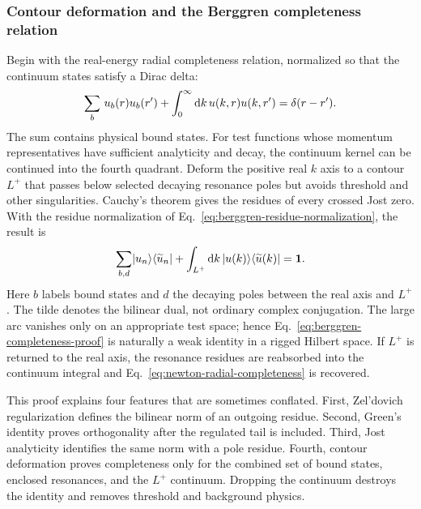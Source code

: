 \subsubsection*{Contour deformation and the Berggren completeness relation}

Begin with the real-energy radial completeness relation, normalized so that
the continuum states satisfy a Dirac delta:
\begin{equation}
  \sum_{b}\,u_b(r)u_b(r')
  +\int_0^\infty\mathrm{d} k\,u(k,r)u(k,r')
  =\delta(r-r') .
  \label{eq:newton-radial-completeness}
\end{equation}
The sum contains physical bound states.  For test functions whose momentum
representatives have sufficient analyticity and decay, the continuum kernel
can be continued into the fourth quadrant.  Deform the positive real
$k$ axis to a contour $L^+$ that passes below selected decaying resonance
poles but avoids threshold and other singularities.  Cauchy's theorem gives
the residues of every crossed Jost zero.  With the residue normalization of
Eq.~\eqref{eq:berggren-residue-normalization}, the result is
\begin{equation}
  \sum_{b,d}\lvert u_n \rangle\langle \widetilde u_n \rvert
  +\int_{L^+}\mathrm{d} k\,
  \lvert u(k) \rangle\langle \widetilde u(k) \rvert
  =\mathbf{1} .
  \label{eq:berggren-completeness-proof}
\end{equation}
Here $b$ labels bound states and $d$ the decaying poles between the real axis
and $L^+$.  The tilde denotes the bilinear dual, not ordinary complex
conjugation.  The large arc vanishes only on an appropriate test space; hence
Eq.~\eqref{eq:berggren-completeness-proof} is naturally a weak identity in a
rigged Hilbert space.  If $L^+$ is returned to the real axis, the resonance
residues are reabsorbed into the continuum integral and
Eq.~\eqref{eq:newton-radial-completeness} is recovered.

This proof explains four features that are sometimes conflated.  First,
Zel'dovich regularization defines the bilinear norm of an outgoing residue.
Second, Green's identity proves orthogonality after the regulated tail is
included.  Third, Jost analyticity identifies the same norm with a pole
residue.  Fourth, contour deformation proves completeness only for the
combined set of bound states, enclosed resonances, and the $L^+$ continuum.
Dropping the continuum destroys the identity and removes threshold and
background physics.

